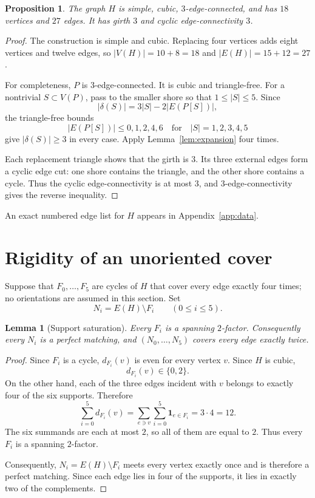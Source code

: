 \documentclass[11pt]{article}
\newtheorem{lemma}[theorem]{Lemma}
\newtheorem{proposition}[theorem]{Proposition}
\theoremstyle{definition}
\newcommand{\dd}{\delta}
\begin{document}
\begin{proposition}\label{prop:eligible}
The graph $H$ is simple, cubic, $3$-edge-connected, and has $18$ vertices and
$27$ edges.  It has girth $3$ and cyclic edge-connectivity $3$.
\end{proposition}

\begin{proof}
The construction is simple and cubic.  Replacing four vertices adds eight
vertices and twelve edges, so $|V(H)|=10+8=18$ and $|E(H)|=15+12=27$.

For completeness, $P$ is $3$-edge-connected.  It is cubic and triangle-free.
For a nontrivial $S\subset V(P)$, pass to the smaller shore so that
$1\leq |S|\leq5$.  Since
\[
|\dd(S)|=3|S|-2|E(P[S])|,
\]
the triangle-free bounds
\[
|E(P[S])|\leq 0,1,2,4,6
\quad\text{for}\quad |S|=1,2,3,4,5
\]
give $|\dd(S)|\geq3$ in every case.  Apply Lemma~\ref{lem:expansion} four
times.

Each replacement triangle shows that the girth is $3$.  Its three external
edges form a cyclic edge cut: one shore contains the triangle, and the other
shore contains a cycle.  Thus the cyclic edge-connectivity is at most $3$,
and $3$-edge-connectivity gives the reverse inequality.
\end{proof}

An exact numbered edge list for $H$ appears in Appendix~\ref{app:data}.

\section{Rigidity of an unoriented cover}

Suppose that $F_0,\ldots,F_5$ are cycles of $H$ that cover every edge exactly
four times; no orientations are assumed in this section.  Set
\[
N_i=E(H)\setminus F_i
\qquad(0\leq i\leq5).
\]

\begin{lemma}[Support saturation]\label{lem:saturation}
Every $F_i$ is a spanning $2$-factor.  Consequently every $N_i$ is a perfect
matching, and $(N_0,\ldots,N_5)$ covers every edge exactly twice.
\end{lemma}

\begin{proof}
Since $F_i$ is a cycle, $d_{F_i}(v)$ is even for every vertex $v$.  Since
$H$ is cubic,
\[
d_{F_i}(v)\in\{0,2\}.
\]
On the other hand, each of the three edges incident with $v$ belongs to
exactly four of the six supports.  Therefore
\[
\sum_{i=0}^{5}d_{F_i}(v)
=
\sum_{e\ni v}\sum_{i=0}^{5}\mathbf{1}_{e\in F_i}
=
3\cdot4
=
12.
\]
The six summands are each at most $2$, so all of them are equal to $2$.
Thus every $F_i$ is a spanning $2$-factor.

Consequently, $N_i=E(H)\setminus F_i$ meets every vertex exactly once and is
therefore a perfect matching.  Since each edge lies in four of the supports,
it lies in exactly two of the complements.
\end{proof}
\end{document}
